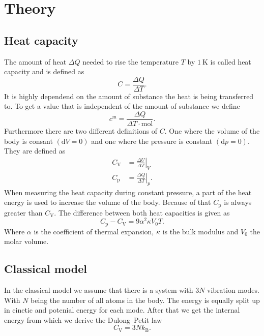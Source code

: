 \section{Theory}
\label{sec:Theory}

\subsection{Heat capacity}
\label{ssec:theory1}

The amount of heat $\Delta Q$ needed to rise the temperature $T$ by $\SI{1}{\kelvin}$ is called heat capacity and is defined as
\begin{equation}
    C = \frac{\Delta Q}{\Delta T}.
    \label{eq:heat}
\end{equation}
It is highly dependend on the amount of substance the heat is being transferred to.
To get a value that is independent of the amount of substance we define
\begin{equation}
    c^{\text{m}} = \frac{\Delta Q}{\Delta T \cdot \si{\mol}}.
    \label{eq:heat_mole}
\end{equation}
Furthermore there are two different definitions of $C$.
One where the volume of the body is consant $(\mathrm{d} V = 0)$ and one where the pressure is constant $(\mathrm{d} p = 0)$.
They are defined as 
\begin{align}
    C_\text{V} &= \left. \frac{\Delta U}{\Delta T} \right\vert_{V}\\ 
    C_\text{p} &= \left. \frac{\Delta Q}{\Delta T} \right\vert_{p}.
\end{align}
When measuring the heat capacity during constant pressure, a part of the heat energy is used to increase the volume of the body.
Because of that $C_\text{p}$ is always greater than $C_\text{V}$.
The difference between both heat capacities is given as
\begin{equation}
    C_\text{p} - C_\text{V} = 9 \alpha ^2 \kappa V_\text{0} T.
    \label{eq:heat_dif}
\end{equation}
Where $\alpha$ is the coefficient of thermal expansion, $\kappa$ is the bulk modulus and $V_\text{0}$ the molar volume.

\subsection{Classical model}
\label{ssec:theory2}

In the classical model we assume that there is a system with $3 N$ vibration modes.
With $N$ being the number of all atoms in the body.
The energy is equally split up in cinetic and potenial energy for each mode.
After that we get the internal energy from which we derive the Dulong–Petit law
\begin{equation}
    C_\text{V} = 3 N k_\text{B}.
    \label{eq:dulong}
\end{equation}

